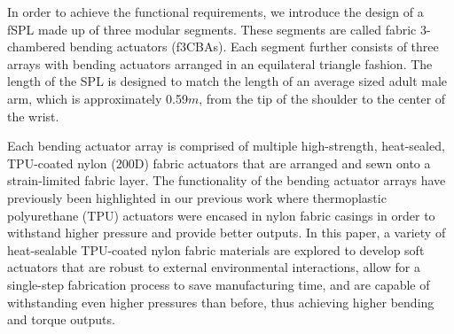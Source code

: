 \documentclass[letterpaper, 10 pt, conference]{ieeeconf}  %
\begin{document}
In order to achieve the functional requirements, we introduce the design of a fSPL made up of three modular segments. These segments are called fabric 3-chambered bending actuators (f3CBAs). Each segment further consists of three arrays with bending actuators arranged in an equilateral triangle fashion. The length of the SPL is designed to match the length of an average sized adult male arm, which is approximately 0.59$m$, from the tip of the shoulder to the center of the wrist.
% 
% 

Each bending actuator array is comprised of multiple high-strength, heat-sealed, TPU-coated nylon (200D) fabric actuators that are arranged and sewn onto a strain-limited fabric layer. The functionality of the bending actuator arrays have previously been highlighted in our previous work \cite{thalman2018} where thermoplastic polyurethane (TPU) actuators were encased in nylon fabric casings in order to withstand higher pressure and provide better outputs. In this paper, a variety of heat-sealable TPU-coated nylon fabric materials are explored to develop soft actuators that are robust to external environmental interactions, allow for a single-step fabrication process to save manufacturing time, and are capable of withstanding even higher pressures than before, thus achieving higher bending and torque outputs.
% 
% 
%
%
\end{document}
